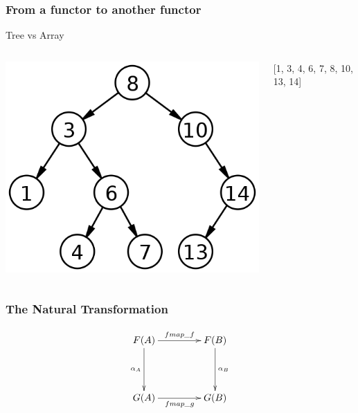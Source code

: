 \documentclass[12pt, xcolor=table]{beamer}
\begin{document}
\begin{frame}
    \frametitle{From a functor to another functor}
    \begin{block}{Tree vs Array}
    \begin{columns}
            \begin{center}
            \includegraphics[scale=0.3]{figures/tree.png}
            \end{center}
            \begin{center}
                [1, 3, 4, 6, 7, 8, 10, 13, 14]
            \end{center}
    \end{columns}
\end{block}
\end{frame}

\begin{frame}
    \frametitle{The Natural Transformation}
            \begin{equation*}
                   \xymatrix@C+2em@R+2em{
                      F(A) \ar[r]^{fmap\_f} \ar[d]_{\alpha_A} & F(B) \ar[d]^{\alpha_B} \\
                      G(A) \ar[r]_{fmap\_g} & G(B)
                     }
            \end{equation*}


\end{frame}
\end{document}

